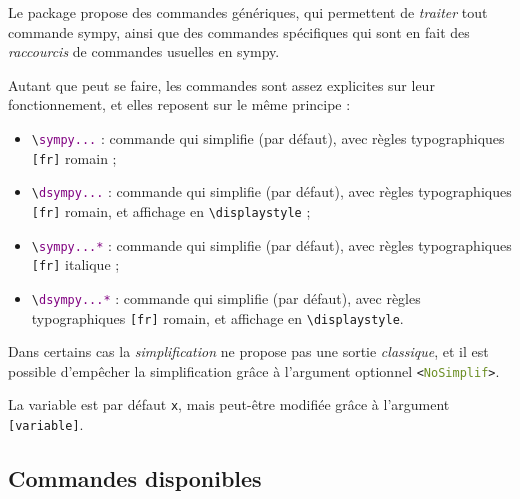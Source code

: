 \documentclass[french,a4paper,11pt]{article}
\begin{document}
\begin{noteblock}
Le package propose des commandes génériques, qui permettent de \textit{traiter} tout commande \textsf{sympy}, ainsi que des commandes spécifiques qui sont en fait des \textit{raccourcis} de commandes usuelles en \textsf{sympy}.

\smallskip

Autant que peut se faire, les commandes sont assez explicites sur leur fonctionnement, et elles reposent sur le même principe :

\begin{itemize}
	\item \texttt{\textbackslash \textcolor{purple}{sympy...}} : commande qui simplifie (par défaut), avec règles typographiques \texttt{[fr]} \textsf{romain} ;
	\item \texttt{\textbackslash \textcolor{purple}{dsympy...}} : commande qui simplifie (par défaut), avec règles typographiques \texttt{[fr]} \textsf{romain}, et affichage en \texttt{\textbackslash displaystyle} ;
	\item \texttt{\textbackslash \textcolor{purple}{sympy...*}} : commande qui simplifie (par défaut), avec règles typographiques \texttt{[fr]} \textsf{italique} ;
	\item \texttt{\textbackslash \textcolor{purple}{dsympy...*}} : commande qui simplifie (par défaut), avec règles typographiques \texttt{[fr]} \textsf{romain}, et affichage en \texttt{\textbackslash displaystyle}.
\end{itemize}

Dans certains cas la \textit{simplification} ne propose pas une sortie \textit{classique}, et il est possible d'empêcher la simplification grâce à l'argument optionnel \texttt{<\textcolor{OliveDrab}{NoSimplif}>}.

\smallskip

La variable est par défaut \texttt{x}, mais peut-être modifiée grâce à l'argument \texttt{[variable]}.
\end{noteblock}

\subsection{Commandes disponibles}
\end{document}
